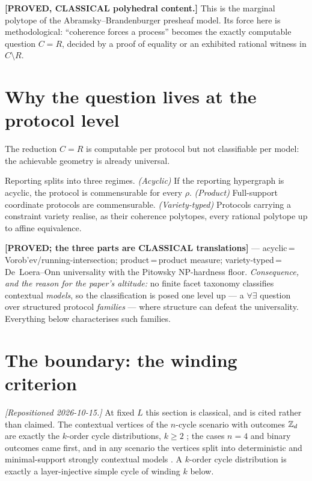 \noindent\textbf{[PROVED, CLASSICAL polyhedral content.]} This is the marginal
polytope of the Abramsky--Brandenburger presheaf model. Its force here is
methodological: ``coherence forces a process'' becomes the exactly computable
question $C=R$, decided by a proof of equality or an exhibited rational witness in
$C\setminus R$.


\section{Why the question lives at the protocol level}\label{sec:hardness}

The reduction $C=R$ is computable per protocol but not classifiable per model: the
achievable geometry is already universal.

\begin{theorem}[trichotomy]\label{thm:trichotomy}
Reporting splits into three regimes. \emph{(Acyclic)} If the reporting hypergraph
is acyclic, the protocol is commensurable for every $\rho$. \emph{(Product)}
Full-support coordinate protocols are commensurable. \emph{(Variety-typed)}
Protocols carrying a constraint variety realise, as their coherence polytopes,
every rational polytope up to affine equivalence.
\end{theorem}

\noindent\textbf{[PROVED; the three parts are CLASSICAL translations]} ---
acyclic\,=\,Vorob'ev/running-intersection; product\,=\,product measure;
variety-typed\,=\,De~Loera--Onn universality with the Pitowsky
\textsf{NP}-hardness floor. \emph{Consequence, and the reason for the paper's
altitude:} no finite facet taxonomy classifies contextual \emph{models}, so the
classification is posed one level up --- a $\forall\exists$ question over
structured protocol \emph{families} --- where structure can defeat the
universality. Everything below characterises such families.


\section{The boundary: the winding criterion}\label{sec:boundary}

\emph{[Repositioned 2026-10-15.]} At fixed $L$ this section is classical, and is
cited rather than claimed. The contextual vertices of the $n$-cycle scenario with
outcomes $\mathbb{Z}_d$ are exactly the $k$-order cycle distributions, $k\ge2$
\cite[Thm.~4.4]{KharoofIpekOkay2024}; the cases $n=4$ \cite{BarrettEtAl2005} and
binary outcomes \cite[Thm.~2]{AraujoQuintinoBudroniTerraCunhaCabello2013} came
first, and in any scenario the vertices split into deterministic and minimal-support
strongly contextual models \cite[Prop.~6.3]{ABKLM2016}. A $k$-order cycle
distribution is exactly a layer-injective simple cycle of winding $k$ below.

